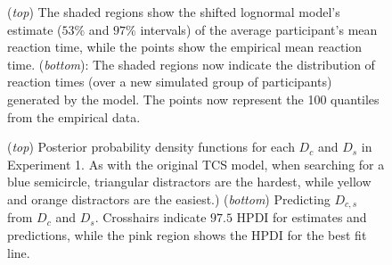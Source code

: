 \documentclass[preprint,12pt,authoryear]{elsarticle}
\begin{document}
\begin{figure}[ht]
\centering
{}
\caption{(\textit{top}) The shaded regions show the shifted lognormal model's estimate ($53\%$ and $97\%$ intervals) of the average participant's mean reaction time, while the points show the empirical mean reaction time. (\textit{bottom}): The shaded regions now indicate the distribution of reaction times (over a new simulated group of participants) generated by the model. The points now represent the 100 quantiles from the empirical data.}
\label{fig:buetti2019_a1}
\end{figure}

\begin{figure}[ht]
\centering
{}
\caption{(\textit{top}) Posterior probability density functions for each $D_c$ and $D_s$ in Experiment 1. As with the original TCS model, when searching for a blue semicircle, triangular distractors are the hardest, while yellow and orange distractors are the easiest.) (\textit{bottom}) Predicting $D_{c,s}$ from $D_c$ and $D_s$. Crosshairs indicate $97.5$ HPDI for estimates and predictions, while the pink region shows the HPDI for the best fit line. }
\label{fig:buetti2019_D}
\end{figure}
\end{document}
